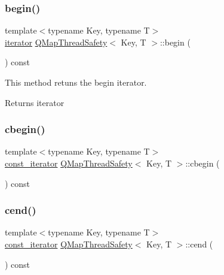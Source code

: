 \subsubsection{\texorpdfstring{begin()}{begin()}}
{\footnotesize\ttfamily template$<$typename Key, typename T$>$ \\
\hyperlink{class_q_map_thread_safety_a454c8af3f68e6d61aecaf1b918aa525b}{iterator} \hyperlink{class_q_map_thread_safety}{Q\+Map\+Thread\+Safety}$<$ Key, T $>$\+::begin (\begin{DoxyParamCaption}{ }\end{DoxyParamCaption}) const\hspace{0.3cm}{\ttfamily [inline]}}



This method retuns the begin iterator. 

\begin{DoxyReturn}{Returns}
iterator 
\end{DoxyReturn}
\mbox{\label{class_q_map_thread_safety_aeddc5f7a55aebb3e93d78cf30a3dd2e1}} 
\subsubsection{\texorpdfstring{cbegin()}{cbegin()}}
{\footnotesize\ttfamily template$<$typename Key, typename T$>$ \\
\hyperlink{class_q_map_thread_safety_aa58d8479729f72b33e305a4d0ca957bd}{const\+\_\+iterator} \hyperlink{class_q_map_thread_safety}{Q\+Map\+Thread\+Safety}$<$ Key, T $>$\+::cbegin (\begin{DoxyParamCaption}{ }\end{DoxyParamCaption}) const\hspace{0.3cm}{\ttfamily [inline]}}

\mbox{\label{class_q_map_thread_safety_a199144509173057ede04d61f7294b266}} 
\subsubsection{\texorpdfstring{cend()}{cend()}}
{\footnotesize\ttfamily template$<$typename Key, typename T$>$ \\
\hyperlink{class_q_map_thread_safety_aa58d8479729f72b33e305a4d0ca957bd}{const\+\_\+iterator} \hyperlink{class_q_map_thread_safety}{Q\+Map\+Thread\+Safety}$<$ Key, T $>$\+::cend (\begin{DoxyParamCaption}{ }\end{DoxyParamCaption}) const\hspace{0.3cm}{\ttfamily [inline]}}

